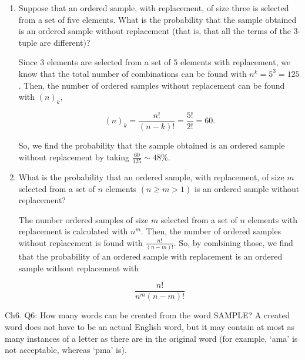 \documentclass[12pt]{article}
\begin{document}
\begin{enumerate}[label=(\alph*)]
\item Suppose that an ordered sample, with replacement, of size three is selected from a set of five elements. What is the probability that the sample obtained is an ordered sample without replacement (that is, that all the terms of the $3$-tuple are different)? 

\vspace{.3cm}
\noindent
Since $3$ elements are selected from a set of $5$ elements with replacement, we know that the total number of combinations can be found with $n^k=5^3=125$. Then, the number of ordered samples without replacement can be found with $(n)_k$,

\begin{equation*}
(n)_k = \frac{n!}{(n-k)!}=\frac{5!}{2!} = 60.
\end{equation*}

\noindent 
So, we find the probability that the sample obtained is an ordered sample without replacement by taking $\frac{60}{125} \sim 48 \%$.

\item What is the probability that an ordered sample, with replacement, of size $m$ selected from a set of $n$ elements $(n \geq m > 1)$ is an ordered sample without replacement?

\vspace{.3cm}
\noindent
The number ordered samples of size $m$ selected from a set of $n$ elements with replacement is calculated with $n^m$. Then, the number of ordered samples without replacement is found with $\frac{n!}{(n-m)!}$. So, by combining those, we find that the probability of an ordered sample with replacement is an ordered sample without replacement with

\noindent
\begin{equation*}
\frac{n!}{n^m(n-m)!}
\end{equation*}
\end{enumerate}

\vspace{.5cm}

\noindent
Ch6. Q6: How many words can be created from the word SAMPLE? A created word does not have to be an actual English word, but it may contain at most as many instances of a letter as there are in the original word (for example, `ama' is not acceptable, whereas `pma' is).
\end{document}
